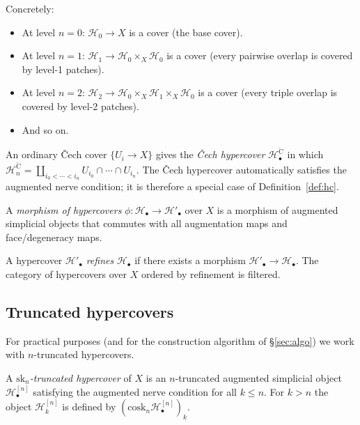 \documentclass[11pt]{article}
\newcommand{\HC}{\mathcal{H}}              %
\newcommand{\sk}{\mathrm{sk}}              %
\newcommand{\cosk}{\mathrm{cosk}}          %
\begin{document}
Concretely:
\begin{itemize}
  \item At level $n = 0$: $\HC_0 \to X$ is a cover (the base cover).
  \item At level $n = 1$: $\HC_1 \to \HC_0 \times_X \HC_0$ is a cover
    (every pairwise overlap is covered by level-1 patches).
  \item At level $n = 2$: $\HC_2 \to \HC_0 \times_X \HC_1 \times_X \HC_0$
    is a cover (every triple overlap is covered by level-2 patches).
  \item And so on.
\end{itemize}

\begin{remark}
  An ordinary Čech cover $\{U_i \to X\}$ gives the \emph{Čech
  hypercover} $\HC^{\mathrm{\check{C}}}_\bullet$ in which $\HC^{\mathrm{\check{C}}}_n
  = \coprod_{i_0 < \cdots < i_n} U_{i_0} \cap \cdots \cap U_{i_n}$.
  The Čech hypercover automatically satisfies the augmented nerve
  condition; it is therefore a special case of
  Definition~\ref{def:hc}.
\end{remark}

\begin{definition}\label{def:hcmor}
  A \emph{morphism of hypercovers} $\phi : \HC_\bullet \to \HC'_\bullet$
  over $X$ is a morphism of augmented simplicial objects that
  commutes with all augmentation maps and face/degeneracy maps.
\end{definition}

\begin{definition}[Refinement]\label{def:refine}
  A hypercover $\HC'_\bullet$ \emph{refines} $\HC_\bullet$ if there
  exists a morphism $\HC'_\bullet \to \HC_\bullet$.  The category of
  hypercovers over $X$ ordered by refinement is filtered.
\end{definition}

\subsection{Truncated hypercovers}

For practical purposes (and for the construction algorithm of
\S\ref{sec:algo}) we work with $n$-truncated hypercovers.

\begin{definition}\label{def:truncated}
  A \emph{$\sk_n$-truncated hypercover} of $X$ is an $n$-truncated
  augmented simplicial object $\HC^{[n]}_\bullet$ satisfying the
  augmented nerve condition for all $k \le n$.  For $k > n$ the object
  $\HC^{[n]}_k$ is defined by $(\cosk_n \HC^{[n]}_\bullet)_k$.
\end{definition}
\end{document}
